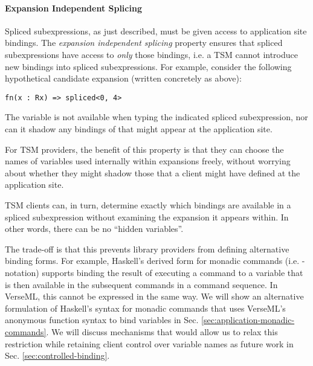\paragraph{Expansion Independent Splicing} Spliced subexpressions, as just described, must be given access to application site bindings. The \emph{expansion independent splicing} property ensures that spliced subexpressions have access to \emph{only} those bindings, i.e. a TSM cannot introduce new bindings into spliced subexpressions. For example, consider the following hypothetical candidate expansion (written concretely as above):
\begin{lstlisting}[numbers=none]
fn(x : Rx) => spliced<0, 4>
\end{lstlisting}
The variable  is not available when typing the indicated spliced subexpression, nor can it shadow any bindings of  that might appear at the application site.

For TSM providers, the benefit of this property is that they can choose the names of variables used internally within expansions freely, without worrying about whether they might shadow those that a client might have defined at the application site.

TSM clients can, in turn, determine exactly which bindings are available in a spliced subexpression without examining the expansion it appears within. In other words, there can be no ``hidden variables''. 

The trade-off is that this prevents library providers from defining  alternative binding forms. For example, Haskell's derived form for monadic commands (i.e. -notation) supports binding the result of executing a command to a variable that is then available in the subsequent commands in a command sequence. In VerseML, this cannot be expressed in the same way. We will show an alternative formulation of Haskell's syntax for monadic commands that uses VerseML's anonymous function syntax to bind variables in Sec. \ref{sec:application-monadic-commands}. We will discuss mechanisms that would allow us to relax this restriction while retaining client control over variable names as future work in Sec. \ref{sec:controlled-binding}.


